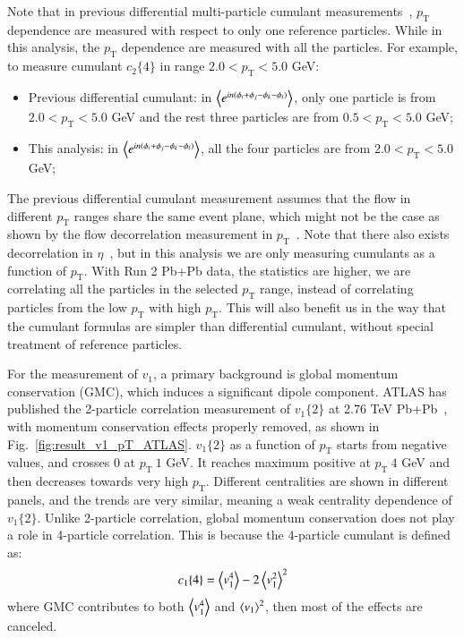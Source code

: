 Note that in previous differential multi-particle cumulant measurements~\cite{Aad:2014vba}, $p_\text{T}$ dependence are measured with respect to only one reference particles. While in this analysis, the $p_\text{T}$ dependence are measured with all the particles. For example, to measure cumulant $c_2\{4\}$ in range $2.0<p_\text{T}<5.0$ GeV:
\begin{itemize}
\item Previous differential cumulant: in $\left\langle e^{in(\phi_i+\phi_j-\phi_k-\phi_l)}\right\rangle$, only one particle is from $2.0<p_\text{T}<5.0$ GeV and the rest three particles are from $0.5<p_\text{T}<5.0$ GeV;
\item This analysis: in $\left\langle e^{in(\phi_i+\phi_j-\phi_k-\phi_l)}\right\rangle$, all the four particles are from $2.0<p_\text{T}<5.0$ GeV;
\end{itemize}
The previous differential cumulant measurement assumes that the flow in different $p_\text{T}$ ranges share the same event plane, which might not be the case as shown by the flow decorrelation measurement in $p_\text{T}$~\cite{Khachatryan:2015oea}. Note that there also exists decorrelation in $\eta$~\cite{Aaboud:2017tql}, but in this analysis we are only measuring cumulants as a function of $p_\text{T}$. With Run 2 Pb+Pb data, the statistics are higher, we are correlating all the particles in the selected $p_\text{T}$ range, instead of correlating particles from the low $p_\text{T}$ with high $p_\text{T}$. This will also benefit us in the way that the cumulant formulas are simpler than differential cumulant, without special treatment of reference particles.

For the measurement of $v_1$, a primary background is global momentum conservation (GMC), which induces a significant dipole component. ATLAS has published the 2-particle correlation measurement of $v_1\{2\}$ at 2.76 TeV Pb+Pb~\cite{ATLAS:2012at}, with momentum conservation effects properly removed, as shown in Fig.~\ref{fig:result_v1_pT_ATLAS}. $v_1\{2\}$ as a function of $p_\text{T}$ starts from negative values, and crosses 0 at $p_\text{T}~1$ GeV. It reaches maximum positive at $p_\text{T}~4$ GeV and then decreases towards very high $p_\text{T}$. Different centralities are shown in different panels, and the trends are very similar, meaning a weak centrality dependence of $v_1\{2\}$. Unlike 2-particle correlation, global momentum conservation does not play a role in 4-particle correlation. This is because the 4-particle cumulant is defined as:
\begin{equation}
c_1\{4\} = \left\langle v_1^4\right\rangle - 2\left\langle v_1^2\right\rangle^2
\end{equation}
where GMC contributes to both $\left\langle v_1^4\right\rangle$ and $\left\langle v_1\right\rangle^2$, then most of the effects are canceled.

